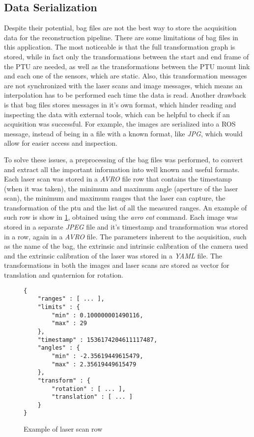 \subsection{Data Serialization}
 
Despite their potential, bag files are not the best way to store the acquisition data for the reconstruction pipeline. There are some limitations of bag files in this application. The most noticeable is that the full transformation graph is stored, while in fact only the transformations between the start and end frame of the PTU are needed, as well as the transformations between the PTU mount link and each one of the sensors, which are static. Also, this transformation messages are not synchronized with the laser scans and image messages, which means an interpolation has to be performed each time the data is read. Another drawback is that bag files stores messages in it's own format, which hinder reading and inspecting the data with external tools, which can be helpful to check if an acquisition was successful. For example, the images are serialized into a ROS message, instead of being in a file with a known format, like \emph{JPG}, which would allow for easier access and inspection.

To solve these issues, a preprocessing of the bag files was performed, to convert and extract all the important information into well known and useful formats. Each laser scan was stored in a \emph{AVRO} file row that contains the timestamp (when it was taken), the minimum and maximum angle (aperture of the laser scan), the minimum and maximum ranges that the laser can capture, the transformation of the ptu and the list of all the measured ranges. An example of such row is show in \cref{figure:laserscan-row}, obtained using the \emph{avro cat} command. Each image was stored in a separate \emph{JPEG} file and it's timestamp and transformation was stored in a row, again in a \emph{AVRO} file. The parameters inherent to the acquisition, such as the name of the bag, the extrinsic and intrinsic calibration of the camera used and the extrinsic calibration of the laser was stored in a \emph{YAML} file. The transformations in both the images and laser scans are stored as vector for translation and quaternion for rotation.

\begin{figure}
    
    \begin{Verbatim}[frame=single, fontsize=\small]
{
    "ranges" : [ ... ],
    "limits" : {
        "min" : 0.100000001490116,
        "max" : 29
    },
    "timestamp" : 1536174204611117487,
    "angles" : {
        "min" : -2.35619449615479,
        "max" : 2.35619449615479
    },
    "transform" : {
        "rotation" : [ ... ],
        "translation" : [ ... ]
    }
}
    \end{Verbatim}

    \caption{Example of laser scan row}
\label{figure:laserscan-row}
\end{figure}

